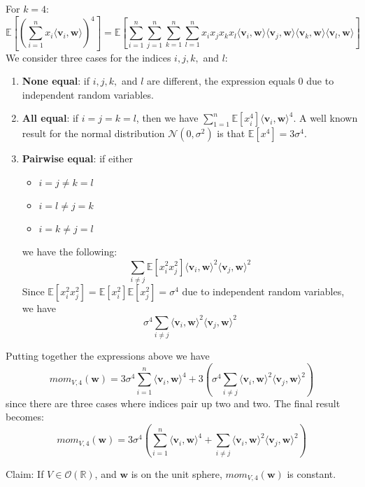 \documentclass[12 pt]{article}        	%
\newcommand{\mat}[1]{\mathit{#1}}
\renewcommand{\vec}[1]{\mathbf{#1}}
\newcommand{\normdist}[2]{\mathcal{N}(#1, #2^2)}
\newcommand{\bb}[1]{\mathbb{#1}}
\begin{document}
For $k=4$:
\[
    \bb{E}[(\sum_{i=1}^{n} x_i \langle \vec{v}_i, \vec{w} \rangle)^4] = \bb{E}[\sum_{i=1}^{n}\sum_{j=1}^{n}\sum_{k=1}^{n}\sum_{l=1}^{n}x_i x_j x_k x_l \langle \vec{v}_i, \vec{w} \rangle \langle \vec{v}_j, \vec{w} \rangle \langle \vec{v}_k, \vec{w} \rangle \langle \vec{v}_l, \vec{w} \rangle]
\]
We consider three cases for the indices $i, j, k,$ and $l$:
\begin{enumerate}
    \item \textbf{None equal}: if $i, j, k,$ and $l$ are different, the expression equals 0 due to independent random variables.
    \item \textbf{All equal}: if $i = j = k = l$, then we have $\sum_{1=1}^{n} \bb{E}[x_i ^4] \langle \vec{v}_i, \vec{w} \rangle^4$. 
        A well known result for the normal distribution $\normdist{0}{\sigma}$ is that $\bb{E}[x^4] = 3 \sigma^4$.
    \item \textbf{Pairwise equal}: if either 
        \begin{itemize}
            \item $i=j \neq k=l$
            \item $i=l \neq j=k$
            \item $i=k \neq j=l$
        \end{itemize}
        we have the following:
        \[
            \sum_{i\neq j} \bb{E}[x_i^2x_j^2] \langle \vec{v}_i, \vec{w} \rangle ^2 \langle \vec{v}_j, \vec{w} \rangle^2
        \]
        Since $\bb{E}[x_i^2x_j^2] = \bb{E}[x_i^2]\bb{E}[x_j^2] = \sigma^4$ due to independent random variables, we have
        \[
            \sigma^4 \sum_{i\neq j} \langle \vec{v}_i, \vec{w} \rangle ^2 \langle \vec{v}_j, \vec{w} \rangle^2
        \]
\end{enumerate}
Putting together the expressions above we have
\[mom_{\mat{V}, 4}(\vec{w}) = 3 \sigma^4 \sum_{i=1}^{n} \langle \vec{v}_i, \vec{w}\rangle^4 + 3(\sigma^4 \sum_{i \neq j} \langle \vec{v}_i, \vec{w}\rangle^2 \langle \vec{v}_j, \vec{w}\rangle^2)\] 
since there are three cases where indices pair up two and two. The final result becomes:
\begin{equation}
    mom_{\mat{V}, 4}(\vec{w}) = 3 \sigma^4 (\sum_{i=1}^{n} \langle \vec{v}_i, \vec{w}\rangle^4 + \sum_{i \neq j} \langle \vec{v}_i, \vec{w}\rangle^2 \langle \vec{v}_j, \vec{w}\rangle^2)
\end{equation}

Claim: If $\mat{V} \in \mathcal{O}(\bb{R})$, and $\vec{w}$ is on the unit sphere, $mom_{\mat{V}, 4}(\vec{w})$ is constant. 
\end{document}
